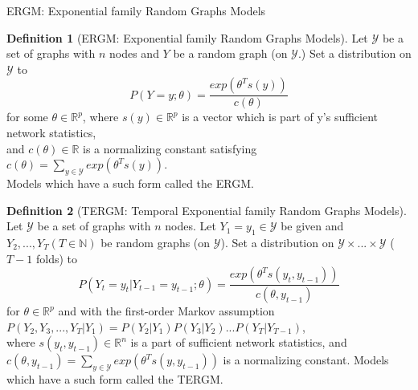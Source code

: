 \documentclass[aspectratio=169,ignorenonframetext,9pt]{beamer}
\theoremstyle{plain}
\theoremstyle{definition}
\newtheorem{defn}{Definition}[section]
\begin{document}
\begin{frame}{ERGM: Exponential family Random Graphs Models}
    \begin{defn}[ERGM: Exponential family Random Graphs Models]
        Let $\mathcal{Y}$ be a set of graphs with $n$ nodes and $Y$ be a random graph (on $\mathcal{Y}$.)
        Set a distribution on $\mathcal{Y}$ to
        \[P(Y=y;\theta) = \frac{exp(\theta^{T}s(y))}{c(\theta)}\]
        for some $\theta\in\mathbb{R}^p$,
        where $s(y)\in\mathbb{R}^p$ is a vector which is part of y's sufficient network statistics,
        \\ and $c(\theta)\in\mathbb{R}$ is a normalizing constant satisfying $c(\theta)=\sum_{y\in\mathcal{Y}}exp(\theta^{T}s(y))$.
        \\ Models which have a such form called the ERGM.
    \end{defn}
    
    \begin{defn}[TERGM: Temporal Exponential family Random Graphs Models]
        Let $\mathcal{Y}$ be a set of graphs with $n$ nodes. 
        Let $Y_1=y_1 \in \mathcal{Y}$ be given and $Y_2,...,Y_T (T\in\mathbb{N})$ be random graphs (on $\mathcal{Y}$).
        Set a distribution on $\mathcal{Y}\times ... \times \mathcal{Y}$ ($T-1$ folds) to
        \[P(Y_t=y_t|Y_{t-1}=y_{t-1};\theta) = \frac{exp(\theta^{T}s(y_t, y_{t-1}))}{c(\theta, y_{t-1})}\]
        for $\theta\in\mathbb{R}^p$ and with the first-order Markov assumption $P(Y_2,Y_3,...,Y_T|Y_1)=P(Y_2|Y_1)P(Y_3|Y_2)...P(Y_T|Y_{T-1})$,
        \\where $s(y_t, y_{t-1})\in\mathbb{R}^n$ is a part of sufficient network statistics,
        and $c(\theta, y_{t-1})=\sum_{y\in\mathcal{Y}}exp(\theta^{T}s(y, y_{t-1}))$ is a normalizing constant.
        Models which have a such form called the TERGM.
    \end{defn}
\end{frame}
\end{document}

